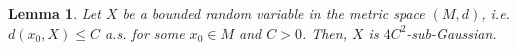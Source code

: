 \documentclass[10pt,a4paper]{article}
\theoremstyle{plain}
\newtheorem{lemma}[theorem]{Lemma}
\theoremstyle{definition}
\theoremstyle{remark}
\newcommand{\R}{\mathbb{R}}
\newcommand{\E}{\mathbb{E}}
\begin{document}
\begin{lemma}\cite[Proposition 1.16]{Ledouxconcentration} \label{boundedsubgauss}
Let $X$ be a bounded random variable in the metric space $(M,d)$, i.e. $d(x_0,X)\leq C$ a.s. for some $x_0\in M$ and $C>0$. Then, $X$ is $4C^2$-sub-Gaussian. 
\end{lemma}





\end{document}
